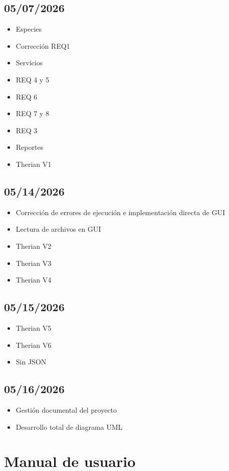 \documentclass[man]{apa7}
\begin{document}
	\subsection{05/07/2026}
		\begin{itemize}
			\item Especies
			\item Corrección REQ1
			\item Servicios
			\item REQ 4 y 5
			\item REQ 6
			\item REQ 7 y 8
			\item REQ 3
			\item Reportes
			\item Therian V1
		\end{itemize}
	\subsection{05/14/2026}
		\begin{itemize}
			\item Corrección de errores de ejecución e implementación directa de GUI
			\item Lectura de archivos en GUI
			\item Therian V2
			\item Therian V3
			\item Therian V4
		\end{itemize}
	\subsection{05/15/2026}
		\begin{itemize}
			\item Therian V5
			\item Therian V6
			\item Sin JSON
		\end{itemize}
	\subsection{05/16/2026}
		\begin{itemize}
			\item Gestión documental del proyecto
			\item Desarrollo total de diagrama UML
		\end{itemize}
	\newpage
	
	\section*{Manual de usuario}\label{sec:Manual de usuario}
	
\end{document}
